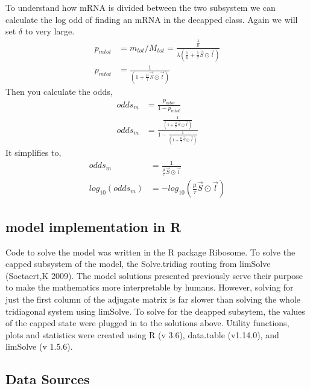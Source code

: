 \documentclass[review]{elsarticle}
\begin{document}
To understand how mRNA is divided  between the two subsystem we can calculate the log odd of finding an mRNA in the decapped class. Again we will set $\delta$ to very large.
\begin{align*}
	p_{mtot} &= m_{tot}/M_{tot} = \frac{\frac{\lambda}{\mu}}{\lambda(\frac{1}{\mu} + \frac{1}{\tau}\vec{S} \odot \vec{l})}	\\
	p_{mtot} &= \frac{1}{(1  + \frac{\mu}{\tau}\vec{S} \odot \vec{l})}	
\end{align*}
Then you calculate the odds,
\begin{align}
	odds_{m}& = \frac{p_{mtot}}{1-p_{mtot}}\\
	odds_{m} &= \frac{\frac{1}{(1  + \frac{\mu}{\tau}\vec{S} \odot \vec{l})}}{1-\frac{1}{(1  + \frac{\mu}{\tau}\vec{S} \odot \vec{l})}}
\end{align}
It simplifies to,
\begin{align}
	odds_{m} &= \frac{1}{\frac{\mu}{\tau}\vec{S} \odot \vec{l}} \\
	log_{10}(odds_{m}) &= -log_{10}(\frac{\mu}{\tau}\vec{S} \odot \vec{l})  \label{eq:log_odds}
\end{align}






\subsection{model implementation in R}
Code to solve the model was written in the R package Ribosome. To solve the capped subsystem of the model, the Solve.tridiag routing from limSolve (Soetaert,K 2009). The model solutions presented previously serve their purpose to make the mathematics more interpretable by humans. However, solving for just the first column of the adjugate matrix is far slower than solving the whole tridiagonal system using limSolve. To solve for the deapped subsytem, the values of the capped state were plugged in to the solutions above. Utility functions, plots and statistics were created using R (v 3.6),  data.table (v1.14.0), and limSolve (v 1.5.6). 
		
\subsection{Data Sources}
\end{document}
